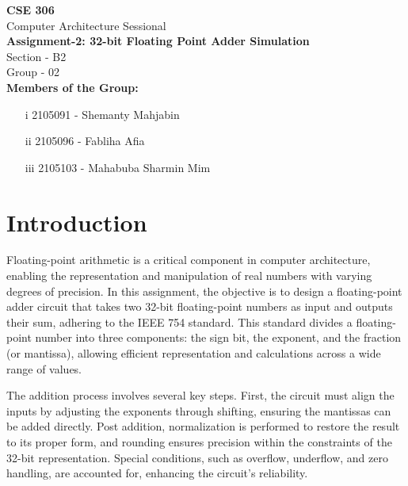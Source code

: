 \documentclass{article}
\begin{document}
\begin{titlepage}
    \centering
    \vspace*{1cm}
    
    \Huge
    \textbf{CSE 306} \\[0.5cm]
    \LARGE
    Computer Architecture Sessional \\[1.5cm]
    
    \Large
    \textbf{Assignment-2: 32-bit Floating Point Adder Simulation} \\[2cm]
    
    \large
    Section - B2 \\[0.3cm]
    Group - 02 \\[2cm]
    
    \Large
    \textbf{Members of the Group:} \\[1cm]
    
    \normalsize
    \begin{itemize}
        \item[i] 2105091 - Shemanty Mahjabin
        \item[ii] 2105096 - Fabliha Afia
        \item[iii] 2105103 - Mahabuba Sharmin Mim
     \end{itemize}    
    
    \vfill
    
\end{titlepage}
\section{Introduction}

Floating-point arithmetic is a critical component in computer architecture, enabling the representation and manipulation of real numbers with varying degrees of precision. In this assignment, the objective is to design a floating-point adder circuit that takes two 32-bit floating-point numbers as input and outputs their sum, adhering to the IEEE 754 standard. This standard divides a floating-point number into three components: the sign bit, the exponent, and the fraction (or mantissa), allowing efficient representation and calculations across a wide range of values.

The addition process involves several key steps. First, the circuit must align the inputs by adjusting the exponents through shifting, ensuring the mantissas can be added directly. Post addition, normalization is performed to restore the result to its proper form, and rounding ensures precision within the constraints of the 32-bit representation. Special conditions, such as overflow, underflow, and zero handling, are accounted for, enhancing the circuit's reliability.
\end{document}

